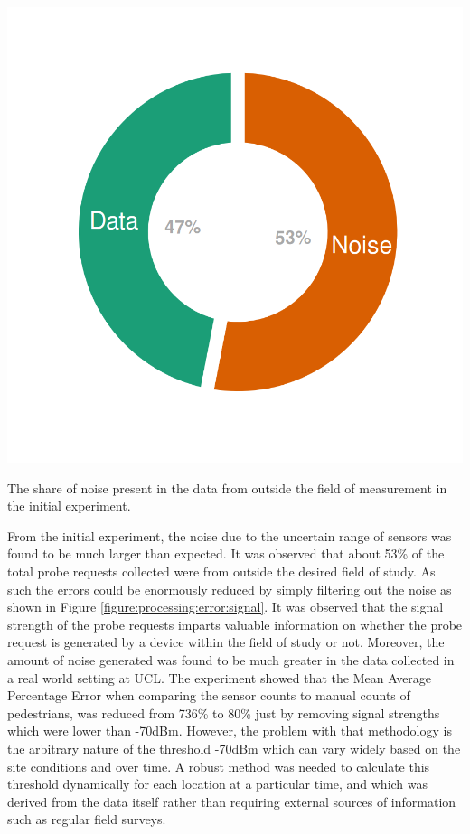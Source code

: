 \begin{marginfigure}
  \includegraphics[trim={10 10 10 10},clip]{images/processing-error-signal.png}
  \caption{The share of noise present in the data from outside the field of measurement in the initial experiment.}
  \label{figure:processing:error:signal}
\end{marginfigure}

From the initial experiment, the noise due to the uncertain range of sensors was found to be much larger than expected.
It was observed that about 53\% of the total probe requests collected were from  outside the desired field of study.
As such the errors could be enormously reduced by simply filtering out the noise as shown in Figure \ref{figure:processing:error:signal}.
It was observed that the signal strength of the probe requests imparts valuable information on whether the probe request is generated by a device within the field of study or not.
Moreover, the amount of noise generated was found to be much greater in the data collected in a real world setting at UCL.
The experiment showed that the Mean Average Percentage Error when comparing the sensor counts to manual counts of pedestrians, was reduced from 736\% to  80\% just by removing signal strengths which were lower than -70dBm.
However, the problem with that methodology is the arbitrary nature of the threshold -70dBm which can vary widely based on the site conditions and over time.
A robust method was needed to calculate this threshold dynamically for each location at a particular time, and which was derived from the data itself rather than requiring external sources of information such as regular field surveys.

